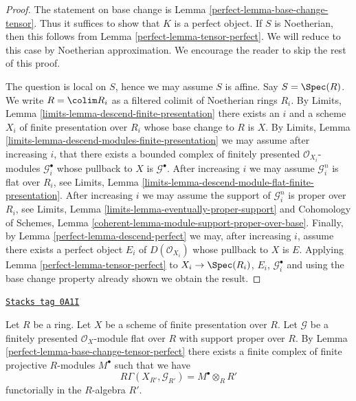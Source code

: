 \begin{proof}

The statement on base change is Lemma \ref{perfect-lemma-base-change-tensor}.
Thus it suffices to show that $K$ is a perfect object. If $S$ is
Noetherian, then this follows from
Lemma \ref{perfect-lemma-tensor-perfect}.
We will reduce to this case by Noetherian approximation.
We encourage the reader to skip the rest of this proof.

\medskip\noindent
The question is local on $S$, hence we may assume $S$ is affine.
Say $S = \Spec(R)$. We write $R = \colim R_i$ as a filtered colimit
of Noetherian rings $R_i$. By Limits, Lemma
\ref{limits-lemma-descend-finite-presentation}
there exists an $i$ and a scheme $X_i$ of finite presentation over $R_i$
whose base change to $R$ is $X$. By
Limits, Lemma \ref{limits-lemma-descend-modules-finite-presentation}
we may assume after increasing $i$, that there exists a bounded
complex of finitely presented $\mathcal{O}_{X_i}$-modules
$\mathcal{G}_i^\bullet$ whose pullback to $X$ is $\mathcal{G}^\bullet$.
After increasing $i$ we may assume $\mathcal{G}_i^n$ is flat over $R_i$, see
Limits, Lemma \ref{limits-lemma-descend-module-flat-finite-presentation}.
After increasing $i$ we may assume the support of $\mathcal{G}_i^n$
is proper over $R_i$, see
Limits, Lemma \ref{limits-lemma-eventually-proper-support}
and Cohomology of Schemes, Lemma
\ref{coherent-lemma-module-support-proper-over-base}.
Finally, by Lemma \ref{perfect-lemma-descend-perfect}
we may, after increasing $i$, assume there exists a perfect
object $E_i$ of $D(\mathcal{O}_{X_i})$ whose pullback to
$X$ is $E$. Applying Lemma \ref{perfect-lemma-tensor-perfect}
to $X_i \to \Spec(R_i)$, $E_i$, $\mathcal{G}_i^\bullet$ and using the
base change property already shown we obtain the result.
\end{proof}

\begin{remark}
\label{perfect-remark-explain-perfect-direct-image}
\href{https://stacks.math.columbia.edu/tag/0A1I}{\texttt{Stacks tag 0A1I}}

Let $R$ be a ring. Let $X$ be a scheme of finite presentation over
$R$. Let $\mathcal{G}$ be a finitely presented $\mathcal{O}_X$-module
flat over $R$ with support proper over $R$. By
Lemma \ref{perfect-lemma-base-change-tensor-perfect}
there exists a finite complex of finite projective $R$-modules
$M^\bullet$ such that we have
$$
R\Gamma(X_{R'}, \mathcal{G}_{R'}) = M^\bullet \otimes_R R'
$$
functorially in the $R$-algebra $R'$.
\end{remark}

